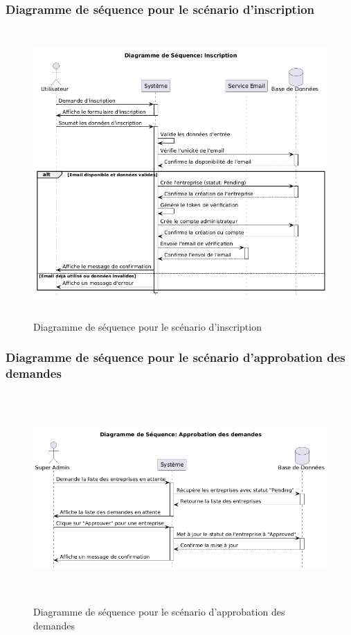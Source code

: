 \subsubsection{Diagramme de séquence pour le scénario d'inscription}
\begin{figure}[H]
    \centering
    \includegraphics[width=12cm,height=11cm]{images/inscription.png}
    \caption{Diagramme de séquence pour le scénario d'inscription}
\end{figure}

\subsubsection{Diagramme de séquence pour le scénario d'approbation des demandes}
\begin{figure}[H]
    \centering
    \includegraphics[width=12cm,height=8cm]{images/demandeseq.png}
    \caption{Diagramme de séquence pour le scénario d'approbation des demandes}
\end{figure}


